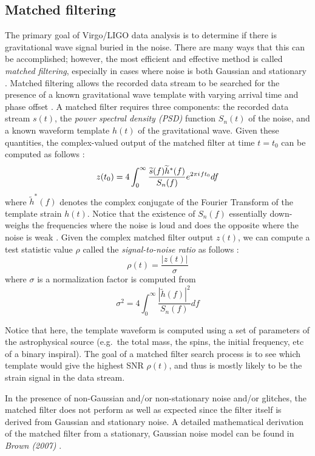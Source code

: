 \documentclass[reprint,
letterpaper,
 amsmath,amssymb,
 aps,
]{revtex4-2}
\newcommand{\iu}{{i\mkern1mu}}
\begin{document}
\subsection{Matched filtering}
The primary goal of Virgo/LIGO data analysis is to determine if there is gravitational wave signal buried in the noise. There are many ways that this can be accomplished; however, the most efficient and effective method is called \textit{matched filtering}, especially in cases where noise is both Gaussian and stationary \cite{helstrom_1975}. Matched filtering allows the recorded data stream to be searched for the presence of a known gravitational wave template with varying arrival time and phase offset \cite{surf}.  A matched filter requires three components: the recorded data stream $s(t)$, the \textit{power spectral density (PSD)} function $S_n(t)$ of the noise, and a known waveform template $h(t)$ of the gravitational wave. Given these quantities, the complex-valued output of the matched filter at time $t=t_0$ can be computed as follows \cite{findchirp}:
\begin{equation}
    z(t_0) = 4\int_0^\infty\frac{\widetilde{s}(f)\widetilde{h}^*(f)}{S_n(f)}e^{2\pi\iu ft_0}df
\end{equation}
where $\widetilde{h}^*(f)$ denotes the complex conjugate of the Fourier Transform of the template strain $h(t)$. Notice that the existence of $S_n(f)$ essentially down-weighs the frequencies where the noise is loud and does the opposite where the noise is weak \cite{ultimate}. Given the complex matched filter output $z(t)$, we can compute a test statistic value $\rho$ called the \textit{signal-to-noise ratio} as follows \cite{findchirp}: 
\begin{equation}
   \rho (t) = \frac{|z(t)|}{\sigma}
\end{equation}
where $\sigma$ is a normalization factor is computed from \cite{findchirp}
\begin{equation}
   \sigma^2 =  4\int_0^\infty\frac{|\widetilde{h}(f)|^2}{S_n(f)}df
\end{equation}

 Notice that here, the template waveform is computed using a set of parameters of the astrophysical source (e.g.\ the total mass, the spins, the initial frequency, etc of a binary inspiral). The goal of a matched filter search process is to see which template would give the highest SNR $\rho (t)$, and thus is mostly likely to be the strain signal in the data stream. 
 
In the presence of non-Gaussian and/or non-stationary noise and/or glitches, the matched filter does not perform as well as expected since the filter itself is derived from Gaussian and stationary noise. A detailed mathematical derivation of the matched filter from a stationary, Gaussian noise model can be found in \textit{Brown (2007)} \cite{brown2007searching}.
\end{document}
